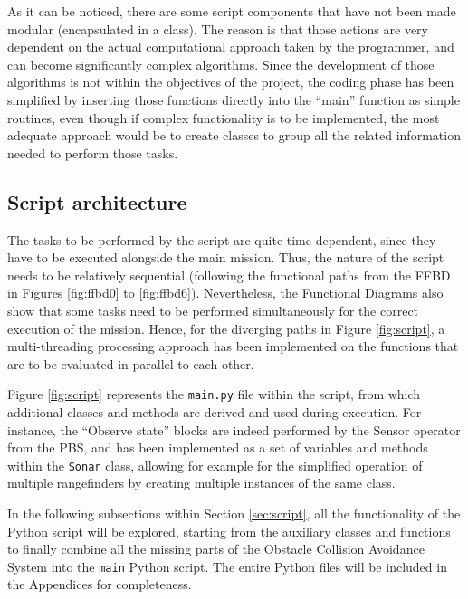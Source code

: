 

As it can be noticed, there are some script components that have not been made modular (encapsulated in a class).
The reason is that those actions are very dependent on the actual computational approach taken by the programmer, and can become significantly complex algorithms.
Since the development of those algorithms is not within the objectives of the project, the coding phase has been simplified by inserting those functions directly into the ``main'' function as simple routines, even though if complex functionality is to be implemented, the most adequate approach would be to create classes to group all the related information needed to perform those tasks.

\subsection{Script architecture}

The tasks to be performed by the script are quite time dependent, since they have to be executed alongside the main mission.
Thus, the nature of the script needs to be relatively sequential (following the functional paths from the FFBD in Figures \ref{fig:ffbd0} to \ref{fig:ffbd6}).
Nevertheless, the Functional Diagrams also show that some tasks need to be performed simultaneously for the correct execution of the mission.
Hence, for the diverging paths in Figure \ref{fig:script}, a multi-threading processing approach has been implemented on the functions that are to be evaluated in parallel to each other.



Figure \ref{fig:script} represents the \texttt{main.py} file within the script, from which additional classes and methods are derived and used during execution.
For instance, the ``Observe state'' blocks are indeed performed by the Sensor operator from the PBS, and has been implemented as a set of variables and methods within the \texttt{Sonar} class, allowing for example for the simplified operation of multiple rangefinders by creating multiple instances of the same class.

In the following subsections within Section \ref{sec:script}, all the functionality of the Python script will be explored, starting from the auxiliary classes and functions to finally combine all the missing parts of the Obstacle Collision Avoidance System into the \texttt{main} Python script.
The entire Python files will be included in the Appendices for completeness.

